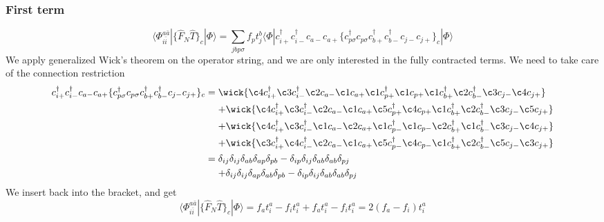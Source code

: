 \documentclass[norsk,a4paper,12pt]{article}
\begin{document}
\subsubsection*{First term}
\begin{equation}
\langle\Phi_{i\bar{i}}^{a\bar{a}}|\{\hat{F}_N\hat{T}\}_c|\Phi\rangle=\sum_{jbp\sigma}f_pt_j^b\langle\Phi|c_{i+}^{\dagger}c_{i-}^{\dagger}c_{a-}c_{a+}\{c_{p\sigma}^{\dagger}c_{p\sigma}c_{b+}^{\dagger}c_{b-}^{\dagger}c_{j-}c_{j+}\}_c|\Phi\rangle
\end{equation}
We apply generalized Wick's theorem on the operator string, and we are only interested in the fully contracted terms. We need to take care of the connection restriction
\begin{align*}
c_{i+}^{\dagger}c_{i-}^{\dagger}c_{a-}c_{a+}\{c_{p\sigma}^{\dagger}c_{p\sigma}c_{b+}^{\dagger}c_{b-}^{\dagger}c_{j-}c_{j+}\}_c
&=\wick{\c4 c_{i+}^{\dagger}\c3 c_{i-}^{\dagger}\c2 c_{a-}\c1 c_{a+}\c1 c_{p+}^{\dagger}\c1 c_{p+}\c1 c_{b+}^{\dagger}\c2 c_{b-}^{\dagger}\c3 c_{j-}\c4 c_{j+}}\notag\\
&\mathrel{\phantom{=}}+\wick{\c4 c_{i+}^{\dagger}\c3 c_{i-}^{\dagger}\c2 c_{a-}\c1 c_{a+}\c5 c_{p+}^{\dagger}\c4 c_{p+}\c1 c_{b+}^{\dagger}\c2 c_{b-}^{\dagger}\c3 c_{j-}\c5 c_{j+}}\notag\\
&\mathrel{\phantom{=}}+\wick{\c4 c_{i+}^{\dagger}\c3 c_{i-}^{\dagger}\c1 c_{a-}\c2 c_{a+}\c1 c_{p-}^{\dagger}\c1 c_{p-}\c2 c_{b+}^{\dagger}\c1 c_{b-}^{\dagger}\c3 c_{j-}\c4 c_{j+}}\notag\\
&\mathrel{\phantom{=}}+\wick{\c3 c_{i+}^{\dagger}\c4 c_{i-}^{\dagger}\c2 c_{a-}\c1 c_{a+}\c5 c_{p-}^{\dagger}\c4 c_{p-}\c1 c_{b+}^{\dagger}\c2 c_{b-}^{\dagger}\c5 c_{j-}\c3 c_{j+}}\notag\\
&=\delta_{ij}\delta_{ij}\delta_{ab}\delta_{ap}\delta_{pb}-\delta_{ip}\delta_{ij}\delta_{ab}\delta_{ab}\delta_{pj}\\
&\mathrel{\phantom{=}}+\delta_{ij}\delta_{ij}\delta_{ap}\delta_{ab}\delta_{pb}-\delta_{ip}\delta_{ij}\delta_{ab}\delta_{ab}\delta_{pj}
\end{align*}
We insert back into the bracket, and get
\begin{equation}
\langle\Phi_{i\bar{i}}^{a\bar{a}}|\{\hat{F}_N\hat{T}\}_c|\Phi\rangle=f_at_i^a-f_it_i^a+f_at_i^a-f_it_i^a=2(f_a-f_i)t_i^a
\end{equation}
\end{document}
